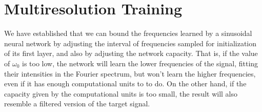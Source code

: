 



\section{Multiresolution Training}

We have established that we can bound the frequencies learned by a sinusoidal neural network by adjusting the interval of frequencies sampled for initialization of its first layer, and also by adjusting the network capacity. That is, if the value of $\omega_0$ is too low, the network will learn the lower frequencies of the signal, fitting their intensities in the Fourier spectrum, but won't learn the higher frequencies, even if it has enough computational units to to do. On the other hand, if the capacity given by the computational units is too small, the result will also resemble a filtered version of the target signal.

